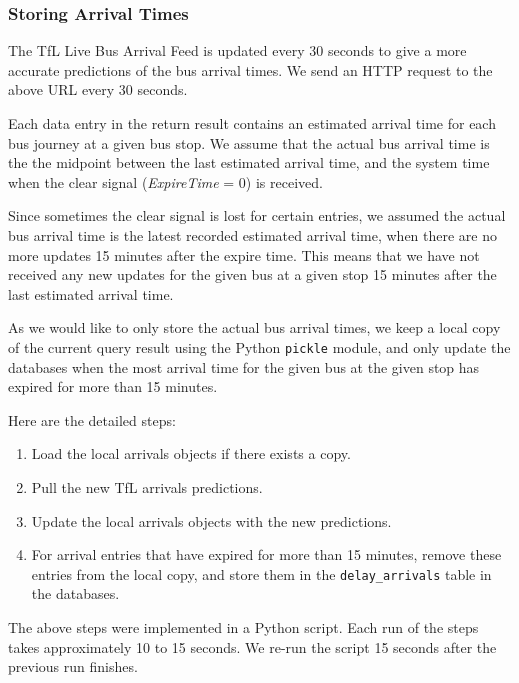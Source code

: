 \subsubsection{Storing Arrival Times}
\par The TfL Live Bus Arrival Feed is updated every 30 seconds to give a more accurate predictions of the bus arrival times. We send an HTTP request to the above URL every 30 seconds.

\par Each data entry in the return result contains an estimated arrival time for each bus journey at a given bus stop. We assume that the actual bus arrival time is the the midpoint between the last estimated arrival time, and the system time when the clear signal (\textit{ExpireTime} = 0) is received.

\par Since sometimes the clear signal is lost for certain entries, we assumed the actual bus arrival time is the latest recorded estimated arrival time, when there are no more updates 15 minutes after the expire time. This means that we have not received any new updates for the given bus at a given stop 15 minutes after the last estimated arrival time.

\par As we would like to only store the actual bus arrival times, we keep a local copy of the current query result using the Python \texttt{pickle} module\cite{pickle}, and only update the databases when the most arrival time for the given bus at the given stop has expired for more than 15 minutes.

\par Here are the detailed steps:

\begin{enumerate}
  \item Load the local arrivals objects if there exists a copy.
  \item Pull the new TfL arrivals predictions.
  \item Update the local arrivals objects with the new predictions.
  \item For arrival entries that have expired for more than 15 minutes, remove these entries from the local copy, and store them in the \texttt{delay\_arrivals} table in the databases.
\end{enumerate}

The above steps were implemented in a Python script. Each run of the steps takes approximately 10 to 15 seconds. We re-run the script 15 seconds after the previous run finishes.
\label{sec:arrivals_daemon}

